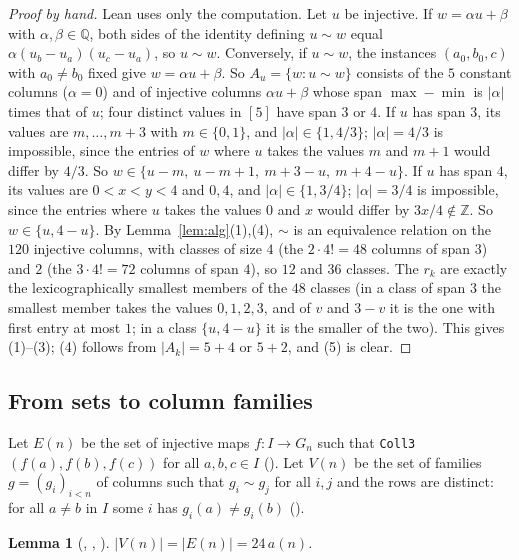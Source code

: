 \documentclass[11pt]{amsart}
\theoremstyle{plain}
\newtheorem{lemma}[theorem]{Lemma}
\theoremstyle{definition}
\newcommand{\Z}{\mathbb{Z}}
\newcommand{\Q}{\mathbb{Q}}
\begin{document}
\begin{proof}[Proof by hand]
Lean uses only the computation. Let $u$ be injective. If $w=\alpha u+\beta$ with $\alpha,\beta\in\Q$, both sides of the identity defining $u\sim w$ equal $\alpha(u_b-u_a)(u_c-u_a)$, so $u\sim w$. Conversely, if $u\sim w$, the instances $(a_0,b_0,c)$ with $a_0\ne b_0$ fixed give $w=\alpha u+\beta$. So $A_u=\{w:u\sim w\}$ consists of the $5$ constant columns ($\alpha=0$) and of injective columns $\alpha u+\beta$ whose span $\max-\min$ is $|\alpha|$ times that of $u$; four distinct values in $[5]$ have span $3$ or $4$.
If $u$ has span $3$, its values are $m,\dots,m+3$ with $m\in\{0,1\}$, and $|\alpha|\in\{1,4/3\}$; $|\alpha|=4/3$ is impossible, since the entries of $w$ where $u$ takes the values $m$ and $m+1$ would differ by $4/3$. So $w\in\{u-m,\ u-m+1,\ m+3-u,\ m+4-u\}$.
If $u$ has span $4$, its values are $0<x<y<4$ and $0,4$, and $|\alpha|\in\{1,3/4\}$; $|\alpha|=3/4$ is impossible, since the entries where $u$ takes the values $0$ and $x$ would differ by $3x/4\notin\Z$. So $w\in\{u,4-u\}$.
By Lemma~\ref{lem:alg}(1),(4), $\sim$ is an equivalence relation on the $120$ injective columns, with classes of size $4$ (the $2\cdot4!=48$ columns of span $3$) and $2$ (the $3\cdot4!=72$ columns of span $4$), so $12$ and $36$ classes. The $r_k$ are exactly the lexicographically smallest members of the $48$ classes (in a class of span $3$ the smallest member takes the values $0,1,2,3$, and of $v$ and $3-v$ it is the one with first entry at most $1$; in a class $\{u,4-u\}$ it is the smaller of the two). This gives (1)--(3); (4) follows from $|A_k|=5+4$ or $5+2$, and (5) is clear.
\end{proof}

\subsection{From sets to column families}
Let $E(n)$ be the set of injective maps $f\colon I\to G_n$ such that \texttt{Coll3}$(f(a),f(b),f(c))$ for all $a,b,c\in I$ (). Let $V(n)$ be the set of families $g=(g_i)_{i<n}$ of columns such that $g_i\sim g_j$ for all $i,j$ and the rows are distinct: for all $a\ne b$ in $I$ some $i$ has $g_i(a)\ne g_i(b)$ ().

\begin{lemma}[, , ]\label{lem:E}
$|V(n)|=|E(n)|=24\,a(n)$.
\end{lemma}
\end{document}

